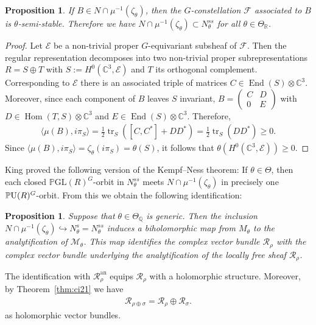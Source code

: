 \documentclass[pdftex]{sigma}
\numberwithin{equation}{section}
\newcommand{\cR}{\mathcal{R}}
\newcommand{\sE}{\mathscr{E}}
\newcommand{\sF}{\mathscr{F}}
\newcommand{\sM}{\mathscr{M}}
\newcommand{\sR}{\mathscr{R}}
\newcommand{\Q}{{\mathbb Q}}
\newcommand{\R}{{\mathbb R}}
\newcommand{\C}{{\mathbb C}}
\newcommand{\GL}{\mathrm{GL}}
\newcommand{\PU}{{\mathbb P}{\rm U}}
\newcommand{\PGL}{{\mathbb P}\GL}
\newcommand{\End}{\operatorname{End}}
\newcommand{\Hom}{\operatorname{Hom}}
\newcommand{\into}{\hookrightarrow}
\newcommand{\tr}{\operatorname{tr}}
\newcommand{\an}{\mathrm{an}}
\newtheorem{Proposition}[Theorem]{Proposition}
 { \theoremstyle{definition}
\newtheorem{Definition}[Theorem]{Definition}
\newtheorem{Remark}[Theorem]{Remark} }
\begin{document}
\begin{Proposition}
  If $B\in N \cap \mu^{-1}(\zeta_\theta)$, then the $G$-constellation $\sF$
  associated to $B$ is $\theta$-semi-stable. Therefore we have
  $N\cap \mu^{-1}(\zeta_\theta) \subset N^{ss}_\theta$ for all $\theta \in
  \Theta_\R$.
\end{Proposition}

\begin{proof}
  Let $\sE$ be a non-trivial proper $G$-equivariant subsheaf of
  $\sF$.  Then the regular representation decomposes into two
  non-trivial proper subrepresentations $ R=S\oplus T$ with
  $S:=H^0(\C^3, \sE)$ and $T$ its orthogonal complement. Corresponding
  to $\sE$ there is an associated triple of matrices
  $C\in\End(S)\otimes \C^3$.  Moreover, since each component of $B$
  leaves $S$ invariant, $B= \left(\begin{smallmatrix} C & D \\ 0 &
      E \end{smallmatrix}\right)$ with $D\in\Hom(T,S)\otimes\C^3$ and $E \in \End(S)\otimes\C^3$.
  Therefore,
  \begin{gather*}
    \langle \mu(B),i\pi_S\rangle
    =\tfrac{1}{2}\tr_S([C,C^*]+DD^*)
    =\tfrac{1}{2}\tr_S(DD^*) \geq 0.
  \end{gather*}
  Since $\langle \mu(B), i \pi_S\rangle  = \zeta_\theta (i\pi_S) = \theta (S)$, it
  follows that $\theta(H^0(\C^3, \sE))\geq 0$.
\end{proof}

King \cite[Theorem~6.1]{King1994} proved the following version of the
Kempf--Ness theorem: If $\theta \in \Theta$, then each closed
$\PGL(R)^G$-orbit in $N^{ss}_\theta$ meets $N\cap
\mu^{-1}(\zeta_\theta)$ in precisely one $\PU(R)^G$-orbit.  From this
we obtain the following identif\/ication:

\begin{Proposition}\label{prop:git-kahler}
  Suppose that $\theta\in\Theta_\Q$ is generic.  Then the inclusion
  $N\cap \mu^{-1}(\zeta_\theta)\into N^s_\theta=N^{ss}_\theta$ induces
  a biholomorphic map from $M_\theta$ to the analytification of
  $\sM_\theta$.  This map identifies the complex vector bundle
  $\cR_\rho$ with the complex vector bundle underlying the
  analytification of the locally free sheaf $\sR_\rho$.
\end{Proposition}

The identif\/ication with $\sR_\rho^\an$ equips $\cR_\rho$ with a
holomorphic structure. Moreover, by Theorem~\ref{thm:ci21} we have
\begin{gather*}%
  \cR_{\rho\oplus\sigma}=\cR_\rho\oplus\cR_\sigma.
\end{gather*}
as holomorphic vector bundles.
\end{document}
